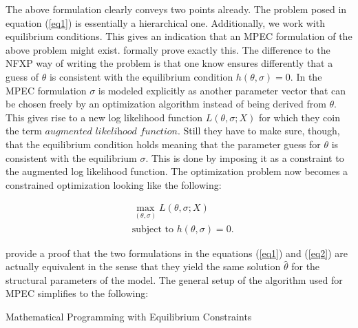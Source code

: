 The above formulation clearly conveys two points already. The problem posed in equation (\ref{eq1}) is essentially a hierarchical one. Additionally, we work with equilibrium conditions. This gives an indication that an MPEC formulation of the above problem might exist. \cite{Su.Judd.2012} formally prove exactly this. The difference to the NFXP way of writing the problem is that one know ensures differently that a guess of $\theta$ is consistent with the equilibrium condition $h(\theta, \sigma)=0$. In the MPEC formulation $\sigma$ is modeled explicitly as another parameter vector that can be chosen freely by an optimization algorithm instead of being derived from $\theta$. This gives rise to a new log likelihood function $L(\theta, \sigma; X)$ for which they coin the term $\textit{augmented likelihood function}$. Still they have to make sure, though, that the equilibrium condition holds meaning that the parameter guess for $\theta$ is consistent with the equilibrium $\sigma$. This is done by imposing it as a constraint to the augmented log likelihood function. The optimization problem now becomes a constrained optimization looking like the following:

\begin{equation}
	\begin{aligned}
		& \max_{(\theta, \sigma)} L(\theta, \sigma; X) \\
		& \text{subject to } h(\theta, \sigma) = 0.
	\end{aligned}
	\label{eq2}
\end{equation}

\cite{Su.Judd.2012} provide a proof that the two formulations in the equations (\ref{eq1}) and (\ref{eq2}) are actually equivalent in the sense that they yield the same solution $\hat\theta$ for the structural parameters of the model. The general setup of the algorithm used for MPEC simplifies to the following:

\vspace{2ex}
\begin{algorithm}[H]
	\SetAlgoLined
	\caption{Mathematical Programming with Equilibrium Constraints}
\end{algorithm}
\vspace{2ex}

